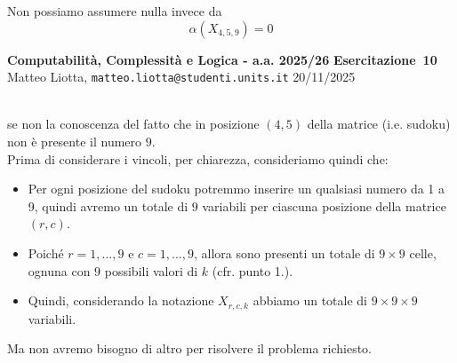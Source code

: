 \documentclass[a4paper,10pt]{article}
\makeatletter
\newcommand{\EsercitazioneNum}{10}
\newcommand{\Data}{20/11/2025}
\newcommand{\DocType}{Esercitazione} %
\newcommand{\FullTitle}{\DocType\ \EsercitazioneNum}
\newcommand{\Header}{
\noindent
  \small \textbf{Computabilità, Complessità e Logica - a.a. 2025/26} \hfill \textbf{\FullTitle} \\[0.2cm]
  \scriptsize Matteo Liotta, \texttt{matteo.liotta@studenti.units.it} \hfill \Data \\[0.2cm]
  \noindent\makebox[\linewidth]{\rule{\linewidth}{0.4pt}} \\[0.3cm]}
\newcommand{\NewPageHeader}{
  \vfill
  \noindent\makebox[\linewidth]{\rule{\linewidth}{0.4pt}}
  \newpage
  {\Header}
}
\makeatother
\begin{document}
{\begin{itemize}[label=, leftmargin=0pt]
\begin{osservazioni}
\begin{center}
    \end{center}

    Non possiamo assumere nulla invece da $$\alpha(X_{4,5,9})=0$$
\end{osservazioni}
\NewPageHeader
\begin{osservazioni}
    se non la conoscenza del fatto che in posizione $(4,5)$ della matrice (i.e. sudoku) non è presente il numero $9$.\\
    
    Prima di considerare i vincoli, per chiarezza, consideriamo quindi che:
    \begin{itemize}
        \item Per ogni posizione del sudoku potremmo inserire un qualsiasi numero da 1 a 9, quindi avremo un totale di $9$ variabili per ciascuna posizione della matrice $(r,c)$.
        \item Poiché $r=1,...,9$ e $c=1,...,9$, allora sono presenti un totale di $9\times 9$ celle, ognuna con $9$ possibili valori di $k$ (cfr. punto 1.).
        \item Quindi, considerando la notazione $X_{r,c,k}$ abbiamo un totale di $9\times9\times9$ variabili.
    \end{itemize}
Ma non avremo bisogno di altro per risolvere il problema richiesto.\\


\end{osservazioni}
\end{itemize}}
\end{document}
